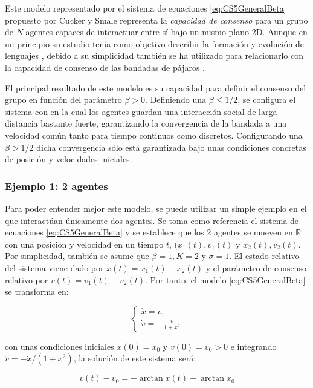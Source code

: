 Este modelo representado por el sistema de ecuaciones \ref{eq:CS5GeneralBeta} propuesto por Cucker y Smale representa la \textit{capacidad de consenso} para un grupo de $N$ agentes capaces de interactuar entre sí bajo un mismo plano 2D. Aunque en un principio su estudio tenía como objetivo describir la formación y evolución de lenguajes \cite{cucker2007emergent}, debido a su simplicidad también se ha utilizado para relacionarlo con la capacidad de consenso de las bandadas de pájaros \cite{cucker2007mathematics}. 

El principal resultado de este modelo es su capacidad para definir el consenso del grupo en función del parámetro $\beta >0$. Definiendo una $\beta \leq 1/2$, se configura el sistema con en la cual los agentes guardan una interacción social de larga distancia bastante fuerte, garantizando la convergencia de la bandada a una velocidad común tanto para tiempo continuos como discretos.  Configurando una $\beta > 1/2$ dicha convergencia sólo está garantizada bajo unas condiciones concretas de posición y velocidades iniciales.


\subsubsection{Ejemplo 1: 2 agentes}\label{example1}
Para poder entender mejor este modelo, se puede utilizar un simple ejemplo en el que interactúan únicamente dos agentes. Se toma como referencia el sistema de ecuaciones \ref{eq:CS5GeneralBeta} y se establece que los 2 agentes se mueven en $\mathbb{R}$ con una posición y velocidad en un tiempo $t$, $(x_1(t),v_1(t)$ y $x_2(t),v_2(t)$. Por simplicidad, también se asume que $\beta=1, K=2$ y $\sigma=1$. El estado relativo del sistema viene dado por $x(t)=x_1(t)-x_2(t)$ y  el parámetro de consenso relativo por $v(t) = v_1(t) - v_2(t)$. Por tanto, el modelo \ref{eq:CS5GeneralBeta} se transforma en:


\begin{equation*}
    \left\lbrace
    \begin{array}{ll}
        \dot{x}=v ,\\
        \dot{v}= \displaystyle{-\frac{v}{1+x^2}}
    \end{array}
    \right.
\end{equation*}

\noindent con unas condiciones iniciales $x(0)=x_0$ y $v(0)=v_0>0$ e integrando $\dot{v}=-\dot{x}/(1+x^2)$, la solución de este sistema será:

\begin{equation*}
    v(t)-v_0=-\arctan x(t) + \arctan x_0
\end{equation*}



